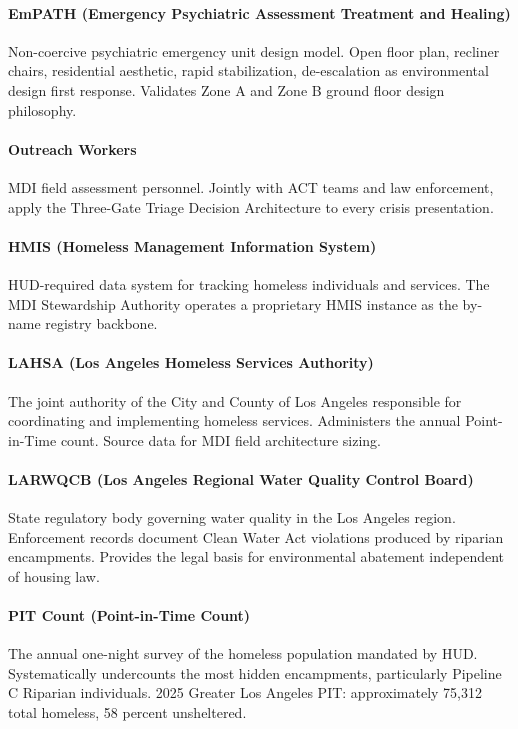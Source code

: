{\paragraph{EmPATH (Emergency Psychiatric Assessment Treatment and Healing)} Non-coercive psychiatric emergency unit design model. Open floor plan, recliner chairs, residential aesthetic, rapid stabilization, de-escalation as environmental design first response. Validates Zone A and Zone B ground floor design philosophy.



\paragraph{Outreach Workers} MDI field assessment personnel. Jointly with ACT teams and law enforcement, apply the Three-Gate Triage Decision Architecture to every crisis presentation.

\paragraph{HMIS (Homeless Management Information System)} HUD-required data system for tracking homeless individuals and services. The MDI Stewardship Authority operates a proprietary HMIS instance as the by-name registry backbone.

\paragraph{LAHSA (Los Angeles Homeless Services Authority)} The joint authority of the City and County of Los Angeles responsible for coordinating and implementing homeless services. Administers the annual Point-in-Time count. Source data for MDI field architecture sizing.

\paragraph{LARWQCB (Los Angeles Regional Water Quality Control Board)} State regulatory body governing water quality in the Los Angeles region. Enforcement records document Clean Water Act violations produced by riparian encampments. Provides the legal basis for environmental abatement independent of housing law.

\paragraph{PIT Count (Point-in-Time Count)} The annual one-night survey of the homeless population mandated by HUD. Systematically undercounts the most hidden encampments, particularly Pipeline C Riparian individuals. 2025 Greater Los Angeles PIT: approximately 75,312 total homeless, 58 percent unsheltered.

}

